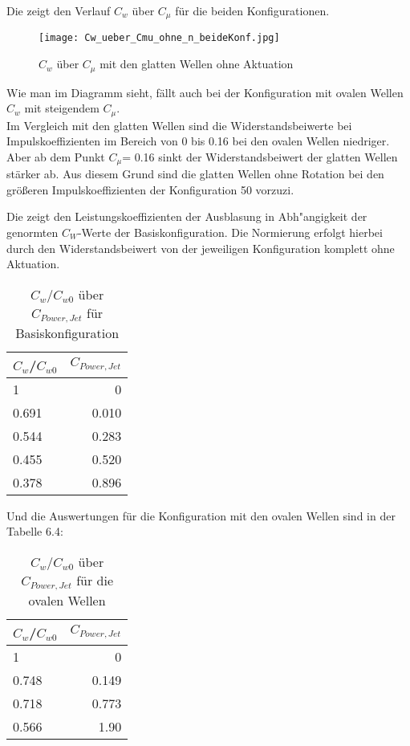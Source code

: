 Die  zeigt den Verlauf $C_{w}$ \"uber $C_{\mu}$ f\"ur die beiden Konfigurationen.
\begin{figure}[h]
	\centering
	\texttt{[image: Cw\_ueber\_Cmu\_ohne\_n\_beideKonf.jpg]}
	\caption{$C_{w}$  \"uber $C_{\mu}$ mit den glatten Wellen ohne Aktuation }
	\label{fig:Cw-Cmu_Konf1+2}
\end{figure}

Wie man im Diagramm sieht, f\"allt auch bei der Konfiguration mit ovalen Wellen  $C_{w}$  mit steigendem $C_{\mu}$.\\
Im Vergleich mit den glatten Wellen sind die Widerstandsbeiwerte bei Impulskoeffizienten im Bereich von 0 bis 0.16  bei den ovalen Wellen niedriger. Aber ab dem Punkt $C_{\mu}$= 0.16 sinkt der Widerstandsbeiwert der glatten Wellen st\"arker ab. Aus diesem Grund sind die glatten Wellen ohne Rotation bei den gr\"o\ss{}eren Impulskoeffizienten der Konfiguration 50 vorzuzi.

Die  zeigt den Leistungskoeffizienten der Ausblasung in Abh"angigkeit der genormten $C_W$-Werte der Basiskonfiguration. Die Normierung erfolgt hierbei durch den Widerstandsbeiwert von der jeweiligen Konfiguration komplett ohne Aktuation.
\begin{table}[h]
	\centering
	\begin{tabular}{lr}
		\toprule
		$C_{w}$/$C_{w0}$ & $C_{Power,Jet}$ \\
		\midrule
		1 & 0\\
		0.691 & 0.010\\
		0.544 & 0.283\\
		0.455 & 0.520\\
		0.378 & 0.896\\
		\bottomrule
	\end{tabular}
	\caption{$C_{w}$/$C_{w0}$ \"uber $C_{Power,Jet}$ f\"ur Basiskonfiguration }
	\label{tab:Cw/Cw0-CpJet_Kon1}
\end{table}

Und die Auswertungen f\"ur die Konfiguration mit den ovalen Wellen sind in der Tabelle 6.4:

\begin{table}[h]
	\centering
	\begin{tabular}{lr}
		\toprule
		$C_{w}$/$C_{w0}$ & $C_{Power,Jet}$ \\
		\midrule
		1 & 0\\
		0.748 & 0.149\\
		0.718 & 0.773\\
		0.566 & 1.90\\
		\bottomrule
	\end{tabular}
	\caption{$C_{w}$/$C_{w0}$ \"uber $C_{Power,Jet}$ f\"ur die ovalen Wellen }
	\label{tab:Cw/Cw0-CpJet_Kon2}
\end{table}

